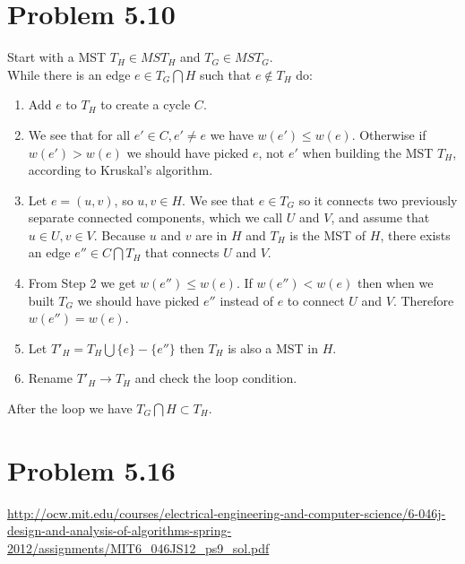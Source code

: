\documentclass[12pt]{report}
\begin{document}
\section{Problem 5.10}
Start with a MST $T_H \in MST_H$ and $T_G \in MST_G$. \\
While there is an edge $e \in T_G \bigcap H$ such that $e \notin T_H$ do:
\begin{enumerate}
  \item Add $e$ to $T_H$ to create a cycle $C$.
  \item We see that for all $e' \in C, e' \ne e$ we have $w(e') \le w(e)$. Otherwise if $w(e') > w(e)$ we should have picked $e$, not $e'$ when building the MST $T_H$, according to Kruskal's algorithm.
  \item Let $e = (u,v)$, so $u, v \in H$. We see that $e \in T_G$ so it connects two previously separate connected components, which we call $U$ and $V$, and assume that $u \in U, v \in V$. Because $u$ and $v$ are in $H$ and $T_H$ is the MST of $H$, there exists an edge $e'' \in C \bigcap T_H$ that connects $U$ and $V$. 
  \item From Step 2 we get $w(e'') \le w(e)$. If $w(e'') < w(e)$ then when we built $T_G$ we should have picked $e''$ instead of $e$ to connect $U$ and $V$. Therefore $w(e'') = w(e)$. 
  \item Let $T'_H = T_H \bigcup \{ e \} - \{ e''\}$ then $T_H$ is also a MST in $H$.
  \item Rename $T'_H \to T_H$ and check the loop condition.
\end{enumerate}

After the loop we have $T_G \bigcap H \subset T_H$.

\section{Problem 5.16}
\url{http://ocw.mit.edu/courses/electrical-engineering-and-computer-science/6-046j-design-and-analysis-of-algorithms-spring-2012/assignments/MIT6_046JS12_ps9_sol.pdf}
\end{document}

